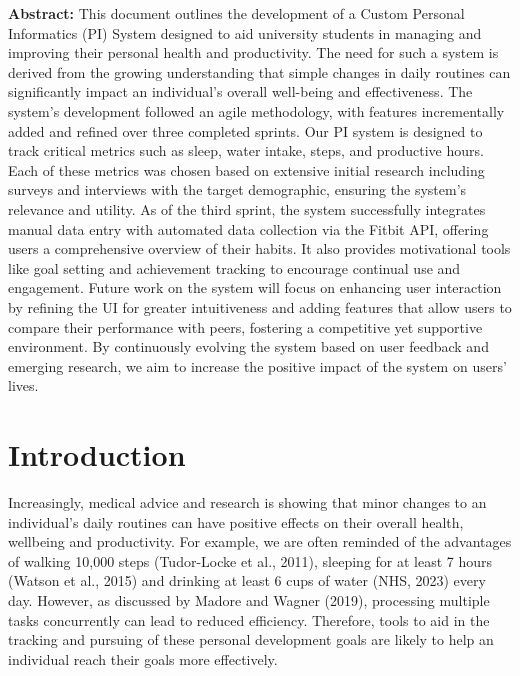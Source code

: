 \documentclass[12pt]{article}
\begin{document}
\begin{titlepage}
\begin{minipage}{0.8\textwidth}
        \normalsize\textbf{Abstract:} This document outlines the development of
        a Custom Personal Informatics (PI) System designed to aid university
        students in managing and improving their personal health and
        productivity. The need for such a system is derived from the growing
        understanding that simple changes in daily routines can significantly
        impact an individual's overall well-being and effectiveness. The
        system's development followed an agile methodology, with features
        incrementally added and refined over three completed sprints. Our PI
        system is designed to track critical metrics such as sleep, water
        intake, steps, and productive hours. Each of these metrics was chosen
        based on extensive initial research including surveys and interviews
        with the target demographic, ensuring the system's relevance and
        utility. As of the third sprint, the system successfully integrates
        manual data entry with automated data collection via the Fitbit API,
        offering users a comprehensive overview of their habits. It also
        provides motivational tools like goal setting and achievement tracking
        to encourage continual use and engagement. Future work on the system
        will focus on enhancing user interaction by refining the UI for greater
        intuitiveness and adding features that allow users to compare their
        performance with peers, fostering a competitive yet supportive
        environment. By continuously evolving the system based on user feedback
        and emerging research, we aim to increase the positive impact of the
        system on users' lives.


    \end{minipage}

    \vfill
\end{titlepage}
\thispagestyle{fancy}

\newpage

\tableofcontents
\thispagestyle{empty}

\newpage

\setcounter{page}{1}


\section{Introduction}

Increasingly, medical advice and research is showing that minor changes to an
individual’s daily routines can have positive effects on their overall health,
wellbeing and productivity. For example, we are often reminded of the
advantages of walking 10,000 steps (Tudor-Locke et al., 2011), sleeping for at
least 7 hours (Watson et al., 2015) and drinking at least 6 cups of water (NHS,
2023) every day. However, as discussed by Madore and Wagner (2019), processing
multiple tasks concurrently can lead to reduced efficiency. Therefore, tools to
aid in the tracking and pursuing of these personal development goals are likely
to help an individual reach their goals more effectively.\par
\end{document}
